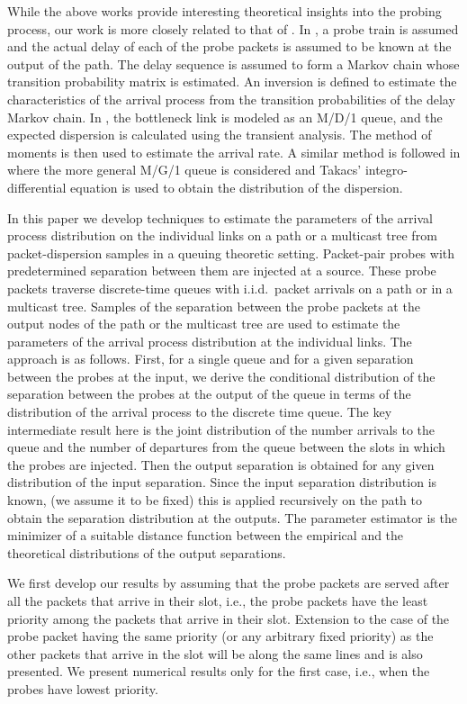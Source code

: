 \documentclass[11pt]{article}
\begin{document}
While the above works provide interesting theoretical insights into
the probing process, our work is more closely related to that of
\cite{Machiraju07,Park06,Haga06}. In \cite{Machiraju07}, a probe train
is assumed and the actual delay of each of the probe packets is
assumed to be known at the output of the path. The delay sequence is
assumed to form a Markov chain whose transition probability matrix is
estimated. An inversion is defined to estimate the characteristics of
the arrival process from the transition probabilities of the delay
Markov chain. In \cite{Park06}, the bottleneck link is modeled as an
M/D/1 queue, and the expected dispersion is calculated using the
transient analysis. The method of moments is then used to estimate the
arrival rate. A similar method is followed in \cite{Haga06} where the
more general M/G/1 queue is considered and Takacs'
integro-differential equation is used to obtain the distribution of
the dispersion.

In this paper we develop techniques to estimate the parameters of the
arrival process distribution on the individual links on a path or a
multicast tree from packet-dispersion samples in a queuing theoretic
setting. Packet-pair probes with predetermined separation between them
are injected at a source.  These probe packets traverse discrete-time
queues with i.i.d.~packet arrivals on a path or in a multicast tree.
Samples of the separation between the probe packets at the output
nodes of the path or the multicast tree are used to estimate the
parameters of the arrival process distribution at the individual
links. The approach is as follows. First, for a single queue and for a
given separation between the probes at the input, we derive the
conditional distribution of the separation between the probes at the
output of the queue in terms of the distribution of the arrival
process to the discrete time queue.  The key intermediate result here
is the joint distribution of the number arrivals to the queue and the
number of departures from the queue between the slots in which the
probes are injected. Then the output separation is obtained for any
given distribution of the input separation.  Since the input
separation distribution is known, (we assume it to be fixed) this is
applied recursively on the path to obtain the separation distribution
at the outputs. The parameter estimator is the minimizer of a suitable
distance function between the empirical and the theoretical
distributions of the output separations.

We first develop our results by assuming that the probe packets are
served after all the packets that arrive in their slot, i.e., the
probe packets have the least priority among the packets that arrive in
their slot. Extension to the case of the probe packet having the same
priority (or any arbitrary fixed priority) as the other packets that
arrive in the slot will be along the same lines and is also presented.
We present numerical results only for the first case, i.e., when the
probes have lowest priority.
\end{document}
